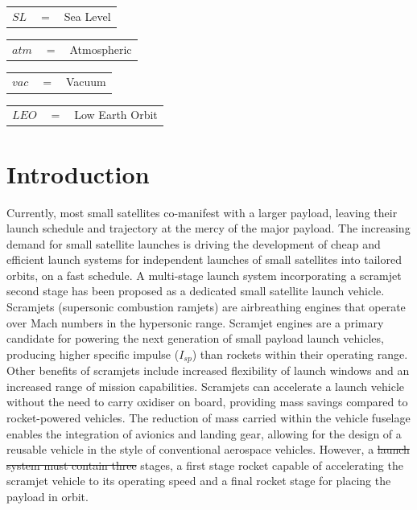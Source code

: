 \documentclass[journal]{new-aiaa}
\providecommand{\DIFadd}[1]{{\protect\color{blue}\uwave{#1}}} %
\providecommand{\DIFdel}[1]{{\protect\color{red}\sout{#1}}}                      %
\providecommand{\DIFaddbegin}{} %
\providecommand{\DIFaddend}{} %
\providecommand{\DIFdelbegin}{} %
\providecommand{\DIFdelend}{} %
\newcommand{\DIFscaledelfig}{0.5}
\newlength{\DIFdelgraphicswidth} %
\newlength{\DIFdelgraphicsheight} %
\newcommand{\DIFaddincludegraphics}[2][]{{\color{blue}\fbox{\DIFOincludegraphics[#1]{#2}}}} %
\newcommand{\DIFdelincludegraphics}[2][]{%
\sbox{\DIFdelgraphicsbox}{\DIFOincludegraphics[#1]{#2}}%
\settoboxwidth{\DIFdelgraphicswidth}{\DIFdelgraphicsbox} %
\settoboxtotalheight{\DIFdelgraphicsheight}{\DIFdelgraphicsbox} %
\scalebox{\DIFscaledelfig}{%
\parbox[b]{\DIFdelgraphicswidth}{\usebox{\DIFdelgraphicsbox}\\[-\baselineskip] \rule{\DIFdelgraphicswidth}{0em}}\llap{\resizebox{\DIFdelgraphicswidth}{\DIFdelgraphicsheight}{%
\setlength{\unitlength}{\DIFdelgraphicswidth}%
\begin{picture}(1,1)%
\thicklines\linethickness{2pt} %
{\color[rgb]{1,0,0}\put(0,0){\framebox(1,1){}}}%
{\color[rgb]{1,0,0}\put(0,0){\line( 1,1){1}}}%
{\color[rgb]{1,0,0}\put(0,1){\line(1,-1){1}}}%
\end{picture}%
}\hspace*{3pt}}} %
} %
\DeclareRobustCommand{\DIFaddbegin}{\DIFOaddbegin \let\includegraphics\DIFaddincludegraphics} %
\DeclareRobustCommand{\DIFaddend}{\DIFOaddend \let\includegraphics\DIFOincludegraphics} %
\DeclareRobustCommand{\DIFdelbegin}{\DIFOdelbegin \let\includegraphics\DIFdelincludegraphics} %
\DeclareRobustCommand{\DIFdelend}{\DIFOaddend \let\includegraphics\DIFOincludegraphics} %
\begin{document}
\begin{tabular}{p{1.2cm}p{1cm}p{5cm}}
	$SL$ & $=$ & Sea Level\\
\end{tabular} 
\begin{tabular}{p{1.2cm}p{1cm}p{5cm}}
	$atm$ & $=$ & Atmospheric\\

\end{tabular} 
\begin{tabular}{p{1.2cm}p{1cm}p{5cm}}
	$vac$ & $=$ & Vacuum\\

\end{tabular} 
\begin{tabular}{p{1.2cm}p{1cm}p{5cm}}
	$LEO$ & $=$ & Low Earth Orbit\\

\end{tabular} 
\newpage
\section{Introduction}






Currently, most small satellites co-manifest with a larger payload, leaving their launch schedule and trajectory at the mercy of the major payload. The  increasing demand for small satellite launches\cite{Faa&Ast&Comstac2015} is driving the development of cheap and efficient launch systems for independent launches of small satellites into tailored orbits, on a fast schedule. 
A multi-stage launch system incorporating a scramjet second stage has been proposed as a dedicated small satellite launch vehicle\cite{Smart2009a}. 
Scramjets (supersonic combustion ramjets) are airbreathing engines that operate over Mach numbers in the hypersonic  range\cite{HeiserWilliamPratt1994}. 
Scramjet engines are a primary candidate for powering the next generation of small payload launch vehicles, producing higher specific impulse ($I_{sp}$)  than rockets within their operating range. Other benefits of scramjets include increased flexibility of launch windows and an increased range of mission capabilities\cite{Flaherty2010}. 
Scramjets can accelerate a launch vehicle without the need to carry oxidiser on board, providing mass savings compared to rocket-powered vehicles. 
 The reduction of mass carried within the vehicle fuselage enables the integration of avionics and landing gear, allowing for the design of a reusable vehicle in the style of conventional aerospace vehicles. 
However, a \DIFdelbegin \DIFdel{launch system must contain three }\DIFdelend \DIFaddbegin \DIFadd{\textcolor{red}{scramjet incorporating} launch system \textcolor{red}{requires two rocket} }\DIFaddend stages, a first stage rocket capable of accelerating the scramjet vehicle to its operating speed and a final rocket stage for placing the payload in orbit. 
\end{document}
